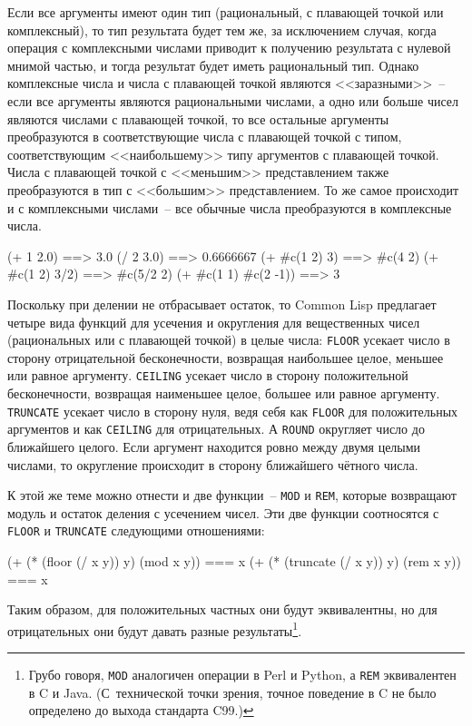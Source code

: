 Если все аргументы имеют один тип (рациональный, с плавающей точкой или комплексный), то
тип результата будет тем же, за исключением случая, когда операция с комплексными числами приводит
к получению результата с нулевой мнимой частью, и тогда результат будет иметь рациональный
тип.  Однако комплексные числа и числа с плавающей точкой являются <<заразными>>~-- если все
аргументы являются рациональными числами, а одно или больше чисел являются числами с
плавающей точкой, то все остальные аргументы преобразуются в соответствующие числа с
плавающей точкой с типом, соответствующим <<наибольшему>> типу аргументов с плавающей
точкой.  Числа с плавающей точкой с <<меньшим>> представлением также преобразуются в тип с
<<большим>> представлением.  То же самое происходит и с комплексными числами~-- все обычные
числа преобразуются в комплексные числа.

\begin{myverb}
  (+ 1 2.0)             ==> 3.0
  (/ 2 3.0)             ==> 0.6666667
  (+ #c(1 2) 3)         ==> #c(4 2)
  (+ #c(1 2) 3/2)       ==> #c(5/2 2)
  (+ #c(1 1) #c(2 -1))  ==> 3
\end{myverb}

Поскольку \code{/} при делении не отбрасывает остаток, то Common Lisp предлагает четыре
вида функций для усечения и округления для вещественных чисел (рациональных или с
плавающей точкой) в целые числа: \lstinline{FLOOR} усекает число в сторону отрицательной
бесконечности, возвращая наибольшее целое, меньшее или равное аргументу. \lstinline{CEILING}
усекает число в сторону положительной бесконечности, возвращая наименьшее целое, большее
или равное аргументу. \lstinline{TRUNCATE} усекает число в сторону нуля, ведя себя как
\lstinline{FLOOR} для положительных аргументов и как \lstinline{CEILING} для отрицательных.  А
\lstinline{ROUND} округляет число до ближайшего целого. Если аргумент находится ровно между
двумя целыми числами, то округление происходит в сторону ближайшего чётного числа.

К этой же теме можно отнести и две функции~-- \lstinline{MOD} и \lstinline{REM}, которые возвращают
модуль и остаток деления с усечением чисел.  Эти две функции соотносятся с \lstinline{FLOOR} и
\lstinline{TRUNCATE} следующими отношениями:
  
\begin{myverb}
  (+ (* (floor    (/ x y)) y) (mod x y)) === x
  (+ (* (truncate (/ x y)) y) (rem x y)) === x
\end{myverb}

Таким образом, для положительных частных они будут эквивалентны, но для отрицательных они
будут давать разные результаты\footnote{Грубо говоря, \lstinline{MOD} аналогичен операции
  \code{\%} в Perl и Python, а \lstinline{REM} эквивалентен \code{\%} в C и
  Java. (С~технической точки зрения, точное поведение \code{\%} в C не было определено до
  выхода стандарта C99.)}.

